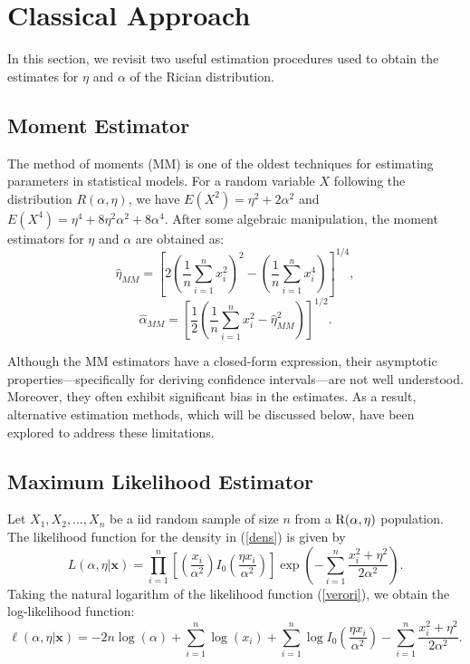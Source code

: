 \documentclass[12pt]{interact}
\theoremstyle{plain}%
\theoremstyle{definition}
\theoremstyle{remark}
\begin{document}
\section{Classical Approach}

In this section, we revisit two useful estimation procedures used to obtain the estimates for $\eta$ and $\alpha$ of the Rician distribution.

\subsection{Moment Estimator}

The method of moments (MM) is one of the oldest techniques for estimating parameters in statistical models. For a random variable $X$ following the distribution $R(\alpha,\eta)$, we have $E(X^2) = \eta^2 + 2\alpha^2$ and $E(X^4) = \eta^4 + 8\eta^2\alpha^2 + 8\alpha^4$. 
After some algebraic manipulation, the moment estimators for $\eta$ and $\alpha$ are obtained as:
\begin{equation}\label{mme1}
\hat{\eta}_{MM}=\left[2\left(\frac{1}{n}\sum_{i=1}^n x_i^2\right)^2-\left(\frac{1}{n}\sum_{i=1}^n x_i^4\right)\right]^{1/4}, 
\end{equation}
\begin{equation}\label{mme2}
\hat{\alpha}_{MM}=\left[\frac{1}{2}\left(\frac{1}{n}\sum_{i=1}^n x_i^2-\hat{\eta}_{MM}^2\right)\right]^{1/2}.
\end{equation}

Although the MM estimators have a closed-form expression, their asymptotic properties—specifically for deriving confidence intervals—are not well understood. Moreover, they often exhibit significant bias in the estimates. As a result, alternative estimation methods, which will be discussed below, have been explored to address these limitations.


\subsection{Maximum Likelihood Estimator}

Let $X_1, X_2, \ldots, X_n$ be a iid random sample of size $n$ from a ${\rm R}(\alpha,\eta)$ population. The likelihood function for the density in (\ref{dens}) is given by
\begin{equation}\label{verori}
L(\alpha,\eta|\boldsymbol{x})=\prod_{i=1}^{n}\left[\left(\frac{x_i}{\alpha^2}\right)I_0\left( \frac{\eta x_i}{\alpha^2} \right)\right] \exp\left( -\sum_{i=1}^{n}\frac{x_i^2 + \eta^2}{2\alpha^2} \right).
\end{equation}
Taking the natural logarithm of the likelihood function (\ref{verori}), we obtain the log-likelihood function:
\begin{equation*}\label{logverogg1}
\ell(\alpha,\eta|\boldsymbol{x})= -2n\log(\alpha) + \sum_{i=1}^{n} \log(x_i) + \sum_{i=1}^{n} \log I_0\left( \frac{\eta x_i}{\alpha^2} \right) - \sum_{i=1}^{n}\frac{x_i^2 + \eta^2}{2\alpha^2}.
\end{equation*}
\end{document}
